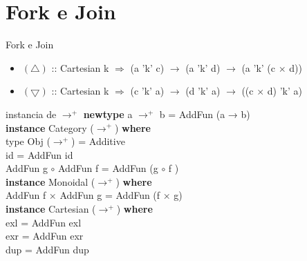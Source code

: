\documentclass{beamer}
\begin{document}
\section{Fork e Join}
\begin{frame}{Fork e Join}
    \begin{itemize}
        \item
            $(\bigtriangleup)$ :: Cartesian k $\Rightarrow$ (a 'k' c) $\to$ (a 'k' d) $\to$ (a 'k' (c $\times$ d))
        \item
            $(\bigtriangledown)$ :: Cartesian k $\Rightarrow$ (c 'k' a) $\to$ (d 'k' a) $\to$ ((c $\times$ d) 'k' a)
    \end{itemize}
\end{frame}
\begin{frame}{instancia de $\to^+$}
    \textbf{newtype} a $\to^+$ b = AddFun (a → b)\\
    \vspace{2mm} 
    \textbf{instance} Category ($\to^+$) \textbf{where}\\
        \hspace{1cm}type Obj ($\to^+$) = Additive\\
        \hspace{1cm}id = AddFun id\\
        \hspace{1cm}AddFun g $\circ$ AddFun f = AddFun (g $\circ$ f )\\
    \vspace{2mm} 
    \textbf{instance} Monoidal ($\to^+$) \textbf{where}\\
        \hspace{1cm}AddFun f × AddFun g = AddFun (f × g)\\
    \vspace{2mm} 
    \textbf{instance} Cartesian ($\to^+$) \textbf{where}\\
        \hspace{1cm}exl = AddFun exl\\
        \hspace{1cm}exr = AddFun exr\\
        \hspace{1cm}dup = AddFun dup\\
\end{frame}
\end{document}
